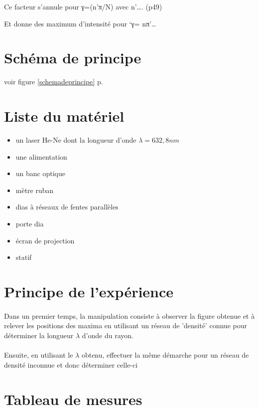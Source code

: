 \documentclass[11pt,a4paper]{report}
\begin{document}
Ce facteur s’annule pour γ=(n’π/N) avec n’…. (p49)

Et donne des maximum d’intensité pour ‘γ= nπ’…

	\section{Schéma de principe}
	voir figure \ref{schemadeprincipe} p.\pageref{schemadeprincipe}
	\section{Liste du matériel}
	\begin{itemize}
	\item un laser He-Ne dont la longueur d'onde $\lambda = 632,8nm$
	\item une alimentation
	\item un banc optique
	\item mètre ruban
	\item dias à réseaux de fentes parallèles
	\item porte dia
	\item écran de projection
	\item statif
	\end{itemize}
	\section{Principe de l'expérience}
\paragraph{}
Dans un premier temps, la manipulation consiste à observer la figure obtenue et à relever les positions des maxima en utilisant un réseau de 'densité' connue pour déterminer la longueur $\lambda$ d'onde du rayon.

\paragraph{}
Ensuite, en utilisant le $\lambda$ obtenu, effectuer la même démarche pour un réseau de densité inconnue et donc déterminer celle-ci

	\section{Tableau de mesures}
\end{document}
